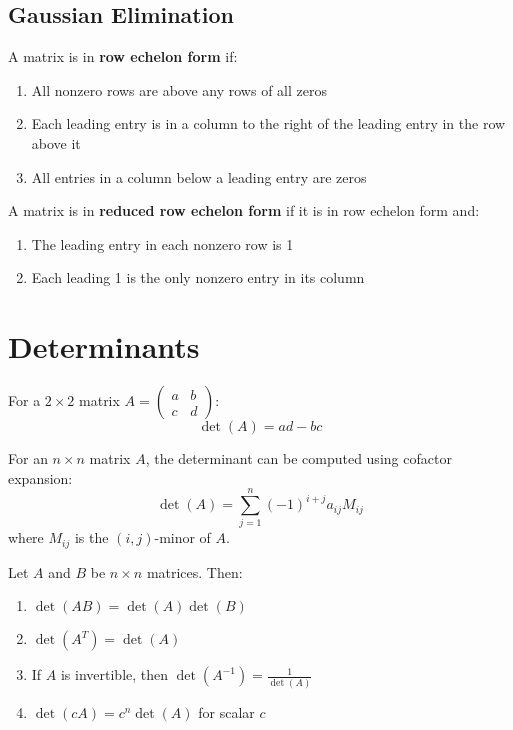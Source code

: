 \subsection{Gaussian Elimination}

\begin{definition}
A matrix is in \textbf{row echelon form} if:
\begin{enumerate}
    \item All nonzero rows are above any rows of all zeros
    \item Each leading entry is in a column to the right of the leading entry in the row above it
    \item All entries in a column below a leading entry are zeros
\end{enumerate}
\end{definition}

\begin{definition}
A matrix is in \textbf{reduced row echelon form} if it is in row echelon form and:
\begin{enumerate}
    \item The leading entry in each nonzero row is 1
    \item Each leading 1 is the only nonzero entry in its column
\end{enumerate}
\end{definition}

\section{Determinants}

\begin{definition}[Determinant (2×2)]
For a $2 \times 2$ matrix $A = \begin{pmatrix} a & b \\ c & d \end{pmatrix}$:
\[\det(A) = ad - bc\]
\end{definition}

\begin{definition}[Determinant (n×n)]
For an $n \times n$ matrix $A$, the determinant can be computed using cofactor expansion:
\[\det(A) = \sum_{j=1}^{n} (-1)^{i+j} a_{ij} M_{ij}\]
where $M_{ij}$ is the $(i,j)$-minor of $A$.
\end{definition}

\begin{theorem}
Let $A$ and $B$ be $n \times n$ matrices. Then:
\begin{enumerate}
    \item $\det(AB) = \det(A)\det(B)$
    \item $\det(A^T) = \det(A)$
    \item If $A$ is invertible, then $\det(A^{-1}) = \frac{1}{\det(A)}$
    \item $\det(cA) = c^n \det(A)$ for scalar $c$
\end{enumerate}
\end{theorem}

